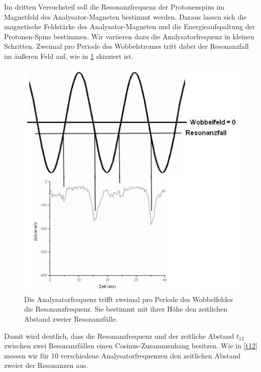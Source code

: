 \documentclass[paper=a4,
	fontsize=10pt,
	DIV=18,
	twocolumn,
	parskip=half
	]{scrartcl}
\numberwithin{equation}{section}    %
\begin{document}
Im dritten Versuchsteil soll die Resonanzfrequenz der Protonenspins im Magnetfeld des Analysator-Magneten bestimmt werden.
Daraus lassen sich die magnetische Feldstärke des Analysator-Magneten und die Energieaufspaltung der Protonen-Spins bestimmen.
Wir variieren dazu die Analysatorfrequenz in kleinen Schritten.
Zweimal pro Periode des Wobbelstromes tritt dabei der Resonanzfall im äußeren Feld auf, wie in \cref{wobbel} skizziert ist.
\begin{figure}[htp]
	\begin{center}
		\includegraphics[width=0.7\columnwidth]{Bilder/Wobbel}
		\caption{Die Analysatorfrequenz trifft zweimal pro Periode des Wobbelfeldes die Resonanzfrequenz. Sie bestimmt mit ihrer Höhe den zeitlichen Abstand zweier Resonanzfälle.}
		\label{wobbel}
	\end{center}
\end{figure}
Damit wird deutlich, dass die Resonanzfrequenz und der zeitliche Abstand $t_{12}$ zwischen zwei Resonanzfällen einen Cosinus-Zusammenhang besitzen.
Wie in \cref{t12} messen wir für 10 verschiedene Analysatorfrequenzen den zeitlichen Abstand zweier der Resonanzen aus.
\end{document}
